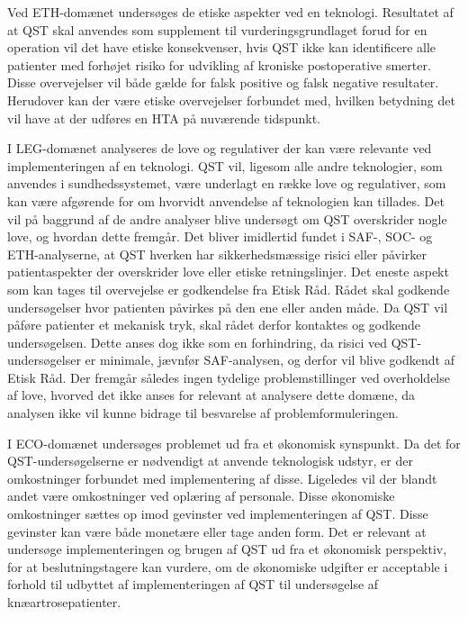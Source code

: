 Ved ETH-domænet undersøges de etiske aspekter ved en teknologi. Resultatet af at QST skal anvendes som supplement til vurderingsgrundlaget forud for en operation vil det have etiske konsekvenser, hvis QST ikke kan identificere alle patienter med forhøjet risiko for udvikling af kroniske postoperative smerter. Disse overvejelser vil både gælde for falsk positive og falsk negative resultater. Herudover kan der være etiske overvejelser forbundet med, hvilken betydning det vil have at der udføres en HTA på nuværende tidspunkt.         

I LEG-domænet analyseres de love og regulativer der kan være relevante ved implementeringen af en teknologi. QST vil, ligesom alle andre teknologier, som anvendes i sundhedssystemet, være underlagt en række love og regulativer, som kan være afgørende for om hvorvidt anvendelse af teknologien kan tillades. Det vil på baggrund af de andre analyser blive undersøgt om QST overskrider nogle love, og hvordan dette fremgår. 
Det bliver imidlertid fundet i SAF-, SOC- og ETH-analyserne, at QST hverken har sikkerhedsmæssige risici eller påvirker patientaspekter der overskrider love eller etiske retningslinjer. Det eneste aspekt som kan tages til overvejelse er godkendelse fra Etisk Råd. Rådet skal godkende undersøgelser hvor patienten påvirkes på den ene eller anden måde. Da QST vil påføre patienter et mekanisk tryk, skal rådet derfor kontaktes og godkende undersøgelsen. Dette anses dog ikke som en forhindring, da risici ved QST-undersøgelser er minimale, jævnfør SAF-analysen, og derfor vil blive godkendt af Etisk Råd. 
Der fremgår således ingen tydelige problemstillinger ved overholdelse af love, hvorved det ikke anses for relevant at analysere dette domæne, da analysen ikke vil kunne bidrage til besvarelse af problemformuleringen.

I ECO-domænet undersøges problemet ud fra et økonomisk synspunkt. Da det for QST-undersøgelserne er nødvendigt at anvende teknologisk udstyr, er der omkostninger forbundet med implementering af disse. Ligeledes vil der blandt andet være omkostninger ved oplæring af personale. Disse økonomiske omkostninger sættes op imod gevinster ved implementeringen af QST. Disse gevinster kan være både monetære eller tage anden form. Det er relevant at undersøge implementeringen og brugen af QST ud fra et økonomisk perspektiv, for at beslutningstagere kan vurdere, om de økonomiske udgifter er acceptable i forhold til udbyttet af implementeringen af QST til undersøgelse af knæartrosepatienter. 


